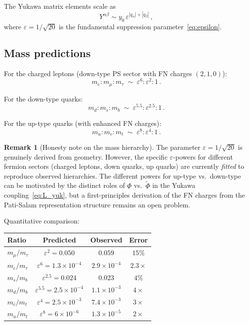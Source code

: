 \documentclass[12pt,a4paper]{article}
\theoremstyle{definition}
\newtheorem{remark}[theorem]{Remark}
\begin{document}
The Yukawa matrix elements scale as
\begin{equation}
Y^{\alpha\beta} \sim y_0\, \varepsilon^{|q_\alpha| + |q_\beta|}\,,
\end{equation}
where $\varepsilon = 1/\sqrt{20}$ is the fundamental suppression parameter~\eqref{eq:epsilon}.

\subsection{Mass predictions}

For the charged leptons (down-type PS sector with FN charges $(2,1,0)$):
\begin{equation}
m_e : m_\mu : m_\tau \;\sim\; \varepsilon^6 : \varepsilon^2 : 1\,.
\end{equation}

For the down-type quarks:
\begin{equation}
m_d : m_s : m_b \;\sim\; \varepsilon^{5.5} : \varepsilon^{2.5} : 1\,.
\end{equation}

For the up-type quarks (with enhanced FN charges):
\begin{equation}
m_u : m_c : m_t \;\sim\; \varepsilon^8 : \varepsilon^4 : 1\,.
\end{equation}

\begin{remark}[Honesty note on the mass hierarchy]
The parameter $\varepsilon = 1/\sqrt{20}$ is genuinely derived from geometry.
However, the specific $\varepsilon$-powers for different fermion sectors (charged leptons, down quarks, up quarks) are currently \emph{fitted} to reproduce observed hierarchies.
The different powers for up-type vs.\ down-type can be motivated by the distinct roles of $\Phi$ vs.\ $\tilde{\Phi}$ in the Yukawa coupling~\eqref{eq:L_yuk}, but a first-principles derivation of the FN charges from the Pati-Salam representation structure remains an open problem.
\end{remark}

Quantitative comparison:

\begin{center}
\renewcommand{\arraystretch}{1.3}
\begin{tabular}{lccc}
\toprule
\textbf{Ratio} & \textbf{Predicted} & \textbf{Observed} & \textbf{Error} \\
\midrule
$m_\mu/m_\tau$ & $\varepsilon^2 = 0.050$ & $0.059$ & $15\%$ \\
$m_e/m_\tau$ & $\varepsilon^6 = 1.3 \times 10^{-4}$ & $2.9 \times 10^{-4}$ & $2.3\times$ \\
$m_s/m_b$ & $\varepsilon^{2.5} = 0.024$ & $0.023$ & $4\%$ \\
$m_d/m_b$ & $\varepsilon^{5.5} = 2.5 \times 10^{-4}$ & $1.1 \times 10^{-3}$ & $4\times$ \\
$m_c/m_t$ & $\varepsilon^4 = 2.5 \times 10^{-3}$ & $7.4 \times 10^{-3}$ & $3\times$ \\
$m_u/m_t$ & $\varepsilon^8 = 6 \times 10^{-6}$ & $1.3 \times 10^{-5}$ & $2\times$ \\
\bottomrule
\end{tabular}
\end{center}
\end{document}
